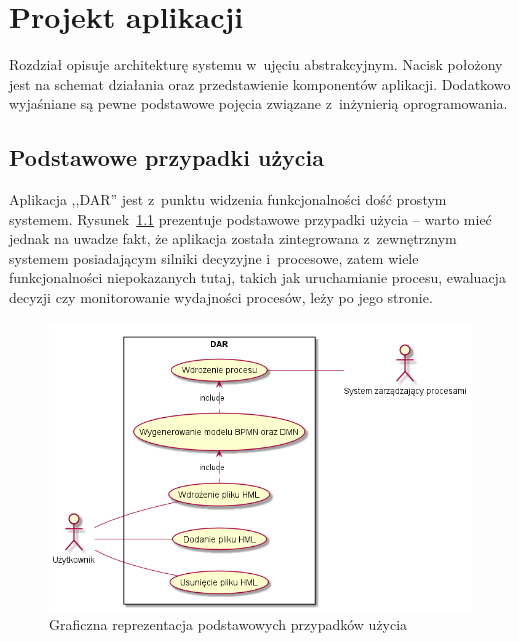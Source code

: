 \chapter{Projekt aplikacji}
\label{cha:projektAplikacji}
Rozdział opisuje architekturę systemu w~ujęciu abstrakcyjnym. Nacisk położony jest na schemat działania oraz przedstawienie komponentów aplikacji. Dodatkowo wyjaśniane są pewne podstawowe pojęcia związane z~inżynierią oprogramowania.

\section{Podstawowe przypadki użycia}
\label{sec:podstawowePrzypadkiUżycia}
Aplikacja ,,DAR'' jest z~punktu widzenia funkcjonalności dość prostym systemem. Rysunek~\ref{fig:usecase} prezentuje podstawowe przypadki użycia -- warto mieć jednak na uwadze fakt, że aplikacja została zintegrowana z~zewnętrznym systemem posiadającym silniki decyzyjne i~procesowe, zatem wiele funkcjonalności niepokazanych tutaj, takich jak uruchamianie procesu, ewaluacja decyzji czy monitorowanie wydajności procesów, leży po jego stronie.
\begin{figure}
    \centering
    \includegraphics[width=\textwidth, height=0.4\textheight,keepaspectratio]{./assets/usecase.png}
    \caption{Graficzna reprezentacja podstawowych przypadków użycia}
    \label{fig:usecase}
\end{figure} 

